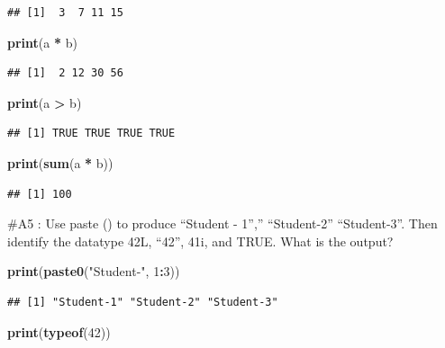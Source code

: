 \documentclass[
]{article}
\newenvironment{Shaded}{\begin{snugshade}}{\end{snugshade}}
\newcommand{\DecValTok}[1]{\textcolor[rgb]{0.00,0.00,0.81}{#1}}
\newcommand{\FunctionTok}[1]{\textcolor[rgb]{0.13,0.29,0.53}{\textbf{#1}}}
\newcommand{\NormalTok}[1]{#1}
\newcommand{\SpecialCharTok}[1]{\textcolor[rgb]{0.81,0.36,0.00}{\textbf{#1}}}
\newcommand{\StringTok}[1]{\textcolor[rgb]{0.31,0.60,0.02}{#1}}
\begin{document}
\begin{verbatim}
## [1]  3  7 11 15
\end{verbatim}

\begin{Shaded}
\begin{Highlighting}[]
\FunctionTok{print}\NormalTok{(a }\SpecialCharTok{*}\NormalTok{ b)}
\end{Highlighting}
\end{Shaded}

\begin{verbatim}
## [1]  2 12 30 56
\end{verbatim}

\begin{Shaded}
\begin{Highlighting}[]
\FunctionTok{print}\NormalTok{(a }\SpecialCharTok{\textgreater{}}\NormalTok{ b)}
\end{Highlighting}
\end{Shaded}

\begin{verbatim}
## [1] TRUE TRUE TRUE TRUE
\end{verbatim}

\begin{Shaded}
\begin{Highlighting}[]
\FunctionTok{print}\NormalTok{(}\FunctionTok{sum}\NormalTok{(a }\SpecialCharTok{*}\NormalTok{ b))}
\end{Highlighting}
\end{Shaded}

\begin{verbatim}
## [1] 100
\end{verbatim}

\#A5 : Use paste () to produce ``Student - 1'','' ``Student-2''
``Student-3''. Then identify the datatype 42L, ``42'', 41i, and TRUE.
What is the output?

\begin{Shaded}
\begin{Highlighting}[]
\FunctionTok{print}\NormalTok{(}\FunctionTok{paste0}\NormalTok{(}\StringTok{"Student{-}"}\NormalTok{, }\DecValTok{1}\SpecialCharTok{:}\DecValTok{3}\NormalTok{))}
\end{Highlighting}
\end{Shaded}

\begin{verbatim}
## [1] "Student-1" "Student-2" "Student-3"
\end{verbatim}

\begin{Shaded}
\begin{Highlighting}[]
\FunctionTok{print}\NormalTok{(}\FunctionTok{typeof}\NormalTok{(}\DecValTok{42}\NormalTok{))}
\end{Highlighting}
\end{Shaded}
\end{document}
